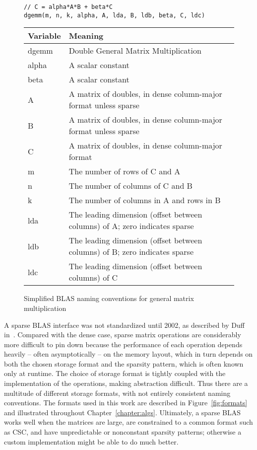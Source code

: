 \begin{figure}
\begin{verbatim}
// C = alpha*A*B + beta*C
dgemm(m, n, k, alpha, A, lda, B, ldb, beta, C, ldc)
\end{verbatim}

\begin{tabular}{ll}
	\toprule
	Variable    &  Meaning \\
	\midrule
	dgemm & Double General Matrix Multiplication \\
	alpha & A scalar constant \\
	beta  & A scalar constant \\
	A     & A matrix of doubles, in dense column-major format unless sparse \\
	B     & A matrix of doubles, in dense column-major format unless sparse \\
	C     & A matrix of doubles, in dense column-major format \\
	m     & The number of rows of C and A \\
	n     & The number of columns of C and B \\
	k     & The number of columns in A and rows in B \\
	lda   & The leading dimension (offset between columns) of A; zero indicates sparse \\
	ldb   & The leading dimension (offset between columns) of B; zero indicates sparse \\
	ldc   & The leading dimension (offset between columns) of C \\


	\bottomrule
\end{tabular}
\caption{Simplified BLAS naming conventions for general matrix multiplication}
\label{fig:blas}
\end{figure}


A sparse BLAS interface was not standardized until 2002, as described by Duff in~\cite{Duff:2002:OSB:567806.567810}. Compared with the dense case, sparse matrix operations are considerably more difficult to pin down because the performance of each operation depends heavily -- often asymptotically -- on the memory layout, which in turn depends on both the chosen storage format and the sparsity pattern, which is often known only at runtime. The choice of storage format is tightly coupled with the implementation of the operations, making abstraction difficult. Thus there are a multitude of different storage formats, with not entirely consistent naming conventions. The formats used in this work are described in Figure~\ref{fig:formats} and illustrated throughout Chapter~\ref{chapter:algs}. Ultimately, a sparse BLAS works well when the matrices are large, are constrained to a common format such as CSC, and have unpredictable or nonconstant sparsity patterns; otherwise a custom implementation might be able to do much better.

